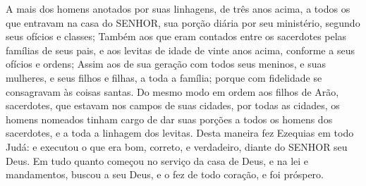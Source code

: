 {  A mais dos homens anotados por suas linhagens, de três anos acima, a todos os que entravam na casa do SENHOR, sua porção diária por seu ministério, segundo seus ofícios e classes;
  Também aos que eram contados entre os sacerdotes pelas famílias de seus pais, e aos levitas de idade de vinte anos acima, conforme a seus ofícios e ordens;
  Assim aos de sua geração com todos seus meninos, e suas mulheres, e seus filhos e filhas, a toda a família; porque com fidelidade se consagravam às coisas santas.
  Do mesmo modo em ordem aos filhos de Arão, sacerdotes, que estavam nos campos de suas cidades, por todas as cidades, os homens nomeados tinham cargo de dar suas porções a todos os homens dos sacerdotes, e a toda a linhagem dos levitas.
  Desta maneira fez Ezequias em todo Judá: e executou o que era bom, correto, e verdadeiro, diante do SENHOR seu Deus.
  Em tudo quanto começou no serviço da casa de Deus, e na lei e mandamentos, buscou a seu Deus, e o fez de todo coração, e foi próspero.
\par }

